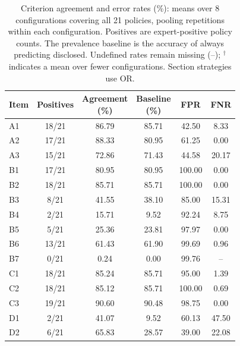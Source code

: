 \begin{table}[t]
\centering\footnotesize
\setlength{\tabcolsep}{3pt}
\caption{Criterion agreement and error rates (\%): means over 8 configurations covering all 21 policies, pooling repetitions within each configuration. Positives are expert-positive policy counts. The prevalence baseline is the accuracy of always predicting disclosed. Undefined rates remain missing (--); $^{\dagger}$ indicates a mean over fewer configurations. Section strategies use OR.}
\label{tab:criterion_errors}
\begin{tabular}{lccccc}
\toprule
Item & Positives & \shortstack{Agreement\\(\%)} & \shortstack{Baseline\\(\%)} & FPR & FNR \\
\midrule
A1 & 18/21 & 86.79 & 85.71 & 42.50 & 8.33 \\
A2 & 17/21 & 88.33 & 80.95 & 61.25 & 0.00 \\
A3 & 15/21 & 72.86 & 71.43 & 44.58 & 20.17 \\
B1 & 17/21 & 80.95 & 80.95 & 100.00 & 0.00 \\
B2 & 18/21 & 85.71 & 85.71 & 100.00 & 0.00 \\
B3 & 8/21 & 41.55 & 38.10 & 85.00 & 15.31 \\
B4 & 2/21 & 15.71 & 9.52 & 92.24 & 8.75 \\
B5 & 5/21 & 25.36 & 23.81 & 97.97 & 0.00 \\
B6 & 13/21 & 61.43 & 61.90 & 99.69 & 0.96 \\
B7 & 0/21 & 0.24 & 0.00 & 99.76 & -- \\
C1 & 18/21 & 85.24 & 85.71 & 95.00 & 1.39 \\
C2 & 18/21 & 85.12 & 85.71 & 100.00 & 0.69 \\
C3 & 19/21 & 90.60 & 90.48 & 98.75 & 0.00 \\
D1 & 2/21 & 41.07 & 9.52 & 60.13 & 47.50 \\
D2 & 6/21 & 65.83 & 28.57 & 39.00 & 22.08 \\
\bottomrule
\end{tabular}
\end{table}